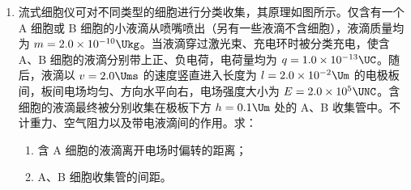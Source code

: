 \documentclass[\gkver]{gaokaozhenti}
\begin{document}
\begin{enumerate}
{故选择正确且正确排序为④①⑥⑤这四步。

（2）根据题意可知纸带上相邻计数点时间间隔 $T = \frac{1}{f} = 0.02 \Us$

根据匀变速直线运动中间时刻瞬时速度等于该过程平均速度可得 $v_{B} = \frac{h_{AC}}{2T}$

代入数据可得 $v_{B} \approx 1.79 \Ums$

（3）根据 $mgh = \frac{1}{2}mv^{2}$

整理可得 $v^{2} = 2g \cdot h$

可知理论上，若机械能守恒，图中直线应通过原点，且斜率 $k = 2g$

由图 3 得直线的斜率 $k = \frac{5.6 - 1.5}{0.295 - 0.08} \approx 19.1$

（4）根据题意有 $\eta = \frac{mgh - \frac{1}{2}mv^{2}}{mgh} \times 100\%$

可得 $\eta = \frac{2g - k}{2g} \times 100\%$

当地重力加速度大小取 $g = 9.80 \Umsq$，代入数据可得 $\eta \approx 3.1\%$。
}

\item
流式细胞仪可对不同类型的细胞进行分类收集，其原理如图所示。仅含有一个 A 细胞或 B 细胞的小液滴从喷嘴喷出（另有一些液滴不含细胞），液滴质量均为 $m = 2.0 \times 10^{-10} \Ukg$。当液滴穿过激光束、充电环时被分类充电，使含 A、B 细胞的液滴分别带上正、负电荷，电荷量均为 $q = 1.0 \times 10^{-13} \UC$。随后，液滴以 $v = 2.0 \Ums$ 的速度竖直进入长度为 $l = 2.0 \times 10^{-2} \Um$ 的电极板间，板间电场均匀、方向水平向右，电场强度大小为 $E = 2.0 \times 10^{5} \UNC$。含细胞的液滴最终被分别收集在极板下方 $h = 0.1 \Um$ 处的 A、B 收集管中。不计重力、空气阻力以及带电液滴间的作用。求：

\begin{enumerate}
	\item
	含 A 细胞的液滴离开电场时偏转的距离；
	\item
	A、B 细胞收集管的间距。
\end{enumerate}


\end{enumerate}
\end{document}
